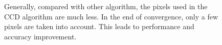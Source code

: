 \begin{figure}[htbp]
  \begin{minipage}[t]{0.5\linewidth} 
    \centering 
  \end{minipage} 
\caption[Pixels used in each iteration]{Generally, compared with other
  algorithm, the pixels used in the CCD algorithm are much less. In
  the end of convergence, only a few pixels are taken into
  account. This leads to performance and accuracy improvement.}
\label{fig:pon}
\end{figure}


